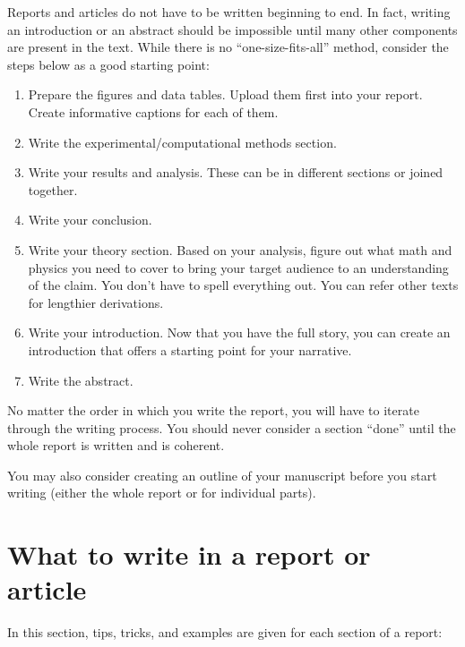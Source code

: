\documentclass[12pt]{article}
\begin{document}
Reports and articles do not have to be written beginning to end. In
fact, writing an introduction or an abstract should be impossible
until many other components are present in the text. While there is no
``one-size-fits-all'' method, consider the steps below as a good
starting point:

\begin{enumerate}
\item Prepare the figures and data tables. Upload them first into your
  report. Create informative captions for each of them.

\item Write the experimental/computational methods section.

\item Write your results and analysis. These can be in different
  sections or joined together.

\item Write your conclusion.

\item Write your theory section. Based on your analysis, figure out
  what math and physics you need to cover to bring your target
  audience to an understanding of the claim. You don't have to spell
  everything out.  You can refer other texts for lengthier
  derivations.

\item Write your introduction. Now that you have the full story, you
  can create an introduction that offers a starting point for your
  narrative.

\item Write the abstract.

\end{enumerate}

No matter the order in which you write the report, you will have to
iterate through the writing process. You should never consider a
section ``done'' until the whole report is written and is coherent.

You may also consider creating an outline of your manuscript before
you start writing (either the whole report or for individual parts).

\newpage

\section{What to write in a report or article}
\label{sec:whattowrite}

In this section, tips, tricks, and examples are given for each
section of a report:
\end{document}
